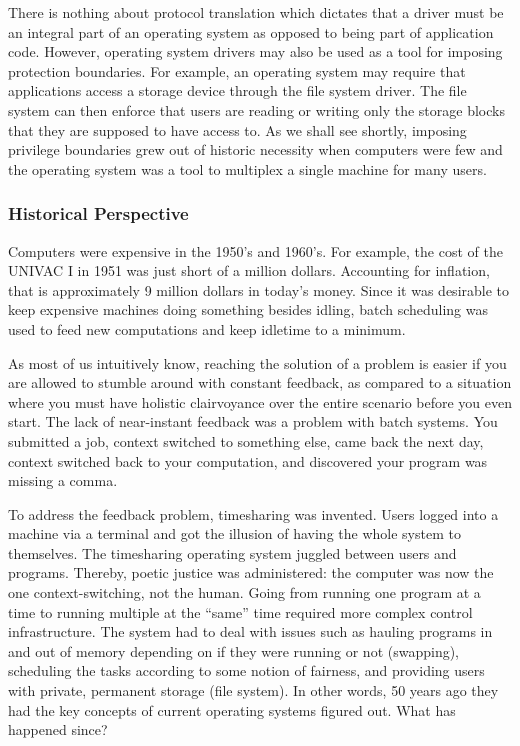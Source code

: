 There is nothing about protocol translation which dictates that a driver
must be an integral part of an operating system as opposed to being part
of application code.  However, operating system drivers may also be used
as a tool for imposing protection boundaries.  For example, an operating
system may require that applications access a storage device through
the file system driver.  The file system can then enforce that users
are reading or writing only the storage blocks that they are supposed to
have access to.  As we shall see shortly, imposing privilege boundaries
grew out of historic necessity when computers were few and the operating
system was a tool to multiplex a single machine for many users.


\subsubsection{Historical Perspective}

Computers were expensive in the 1950's and 1960's.  For example, the cost of
the UNIVAC I in 1951 was just short of a million dollars.  Accounting for
inflation, that is approximately 9 million dollars in today's money.
Since it was desirable to keep expensive machines doing something
besides idling, batch scheduling was used to feed new computations and
keep idletime to a minimum.

As most of us intuitively know, reaching the solution of a problem is
easier if you are allowed to stumble around with constant feedback, as
compared to a situation where you must have holistic clairvoyance over the
entire scenario before you even start.  The lack of near-instant feedback
was a problem with batch systems.  You submitted a job, context switched
to something else, came back the next day, context switched back to your
computation, and discovered your program was missing a comma.

To address the feedback problem, timesharing was invented.  Users logged
into a machine via a terminal and got the illusion of having the whole
system to themselves.  The timesharing operating system juggled between
users and programs.  Thereby, poetic justice was administered: the
computer was now the one context-switching, not the human.  Going from
running one program at a time to running multiple at the ``same'' time
required more complex control infrastructure.  The system had to deal
with issues such as hauling programs in and out of memory depending on
if they were running or not (swapping), scheduling the tasks according
to some notion of fairness, and providing users with private, permanent
storage (file system).  In other words, 50 years ago they had the key
concepts of current operating systems figured out.  What has happened
since?

